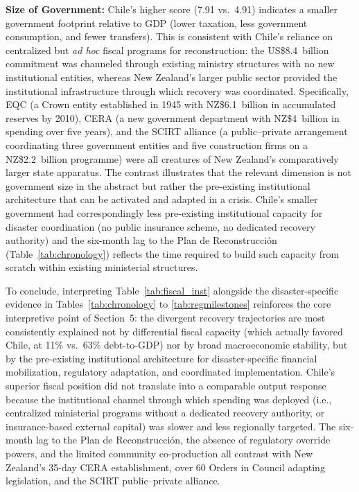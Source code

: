\documentclass[12pt]{article}
\begin{document}
\textbf{Size of Government:} Chile's higher score (7.91 vs.\ 4.91) indicates a smaller government footprint relative to GDP (lower taxation, less government consumption, and fewer transfers). This is consistent with Chile's reliance on centralized but \textit{ad hoc} fiscal programs for reconstruction: the US\$8.4~billion commitment was channeled through existing ministry structures with no new institutional entities, whereas New Zealand's larger public sector provided the institutional infrastructure through which recovery was coordinated. Specifically, EQC (a Crown entity established in 1945 with NZ\$6.1~billion in accumulated reserves by 2010), CERA (a new government department with NZ\$4~billion in spending over five years), and the SCIRT alliance (a public--private arrangement coordinating three government entities and five construction firms on a NZ\$2.2~billion programme) were all creatures of New Zealand's comparatively larger state apparatus. The contrast illustrates that the relevant dimension is not government size in the abstract but rather the pre-existing institutional architecture that can be activated and adapted in a crisis. Chile's smaller government had correspondingly less pre-existing institutional capacity for disaster coordination (no public insurance scheme, no dedicated recovery authority) and the six-month lag to the Plan de Reconstrucci{\'o}n (Table~\ref{tab:chronology}) reflects the time required to build such capacity from scratch within existing ministerial structures.

To conclude, interpreting Table~\ref{tab:fiscal_inst} alongside the disaster-specific evidence in Tables~\ref{tab:chronology} to \ref{tab:regmilestones} reinforces the core interpretive point of Section~5: the divergent recovery trajectories are most consistently explained not by differential fiscal capacity (which actually favored Chile, at 11\% vs.\ 63\% debt-to-GDP) nor by broad macroeconomic stability, but by the pre-existing institutional architecture for disaster-specific financial mobilization, regulatory adaptation, and coordinated implementation. Chile's superior fiscal position did not translate into a comparable output response because the institutional channel through which spending was deployed (i.e., centralized ministerial programs without a dedicated recovery authority, or insurance-based external capital) was slower and less regionally targeted. The six-month lag to the Plan de Reconstrucci{\'o}n, the absence of regulatory override powers, and the limited community co-production all contrast with New Zealand's 35-day CERA establishment, over 60 Orders in Council adapting legislation, and the SCIRT public--private alliance.
\end{document}
